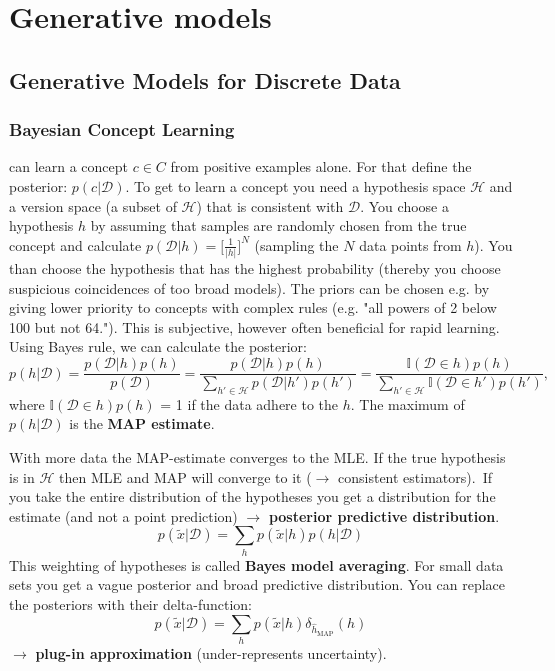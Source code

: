 \documentclass[../main.tex]{subfiles}
\begin{document}
\section{Generative models}

\subsection{Generative Models for Discrete Data}
    \subsubsection{Bayesian Concept Learning} 
        can learn a concept $c \in C$ from positive examples alone. For that define the posterior: $p(c|\mathcal{D})$. To get to learn a concept you need a hypothesis space $\mathcal{H}$ and a version space (a subset of $\mathcal{H}$) that is consistent with $\mathcal{D}$. You choose a hypothesis $h$ by assuming that samples are randomly chosen from the true concept and calculate $p(\mathcal{D}|h)=\lbrack \frac{1}{|h|}\rbrack^N$ (sampling the $N$ data points from $h$). You than choose the hypothesis that has the highest probability (thereby you choose suspicious coincidences of too broad models). The priors can be chosen e.g. by giving lower priority to concepts with complex rules (e.g. "all powers of 2 below 100 but not 64."). This is subjective, however often beneficial for rapid learning. \\
        Using Bayes rule, we can calculate the posterior:
        $$
        p(h|\mathcal{D}) =\dfrac{p(\mathcal{D}|h)p(h)}{p(\mathcal{D})} =  \dfrac{p(\mathcal{D}|h)p(h)}{\sum_{h' \in \mathcal{H}}p(\mathcal{D}|h')p(h')}=\dfrac{\mathbb{I}(\mathcal{D} \in h)p(h)}{\sum_{h' \in \mathcal{H}}\mathbb{I}(\mathcal{D} \in h')p(h')},
        $$
        where $\mathbb{I}(\mathcal{D} \in h)p(h)$ = 1 if the data adhere to the $h$. The maximum of $p(h|\mathcal{D})$ is the \textbf{MAP estimate}. 
        
        With more data the MAP-estimate converges to the MLE. If the true hypothesis is in $\mathcal{H}$ then MLE and MAP will converge to it ($\rightarrow$ consistent estimators). If you take the entire distribution of the hypotheses you get a distribution for the estimate (and not a point prediction) $\rightarrow$ \textbf{posterior predictive distribution}.
        $$
        p(\tilde{x}|\mathcal{D}) = \sum_h p(\tilde{x}|h)p(h|\mathcal{D}) 
        $$
        This weighting of hypotheses is called \textbf{Bayes model averaging}. For small data sets you get a vague posterior and broad predictive distribution. You can replace the posteriors with their delta-function:
        $$
        p(\tilde{x}|\mathcal{D}) = \sum_h p(\tilde{x}|h)\delta_{\hat{h}_{\text{MAP}}}(h)
        $$
        $\rightarrow$ \textbf{plug-in approximation} (under-represents uncertainty).
\end{document}
